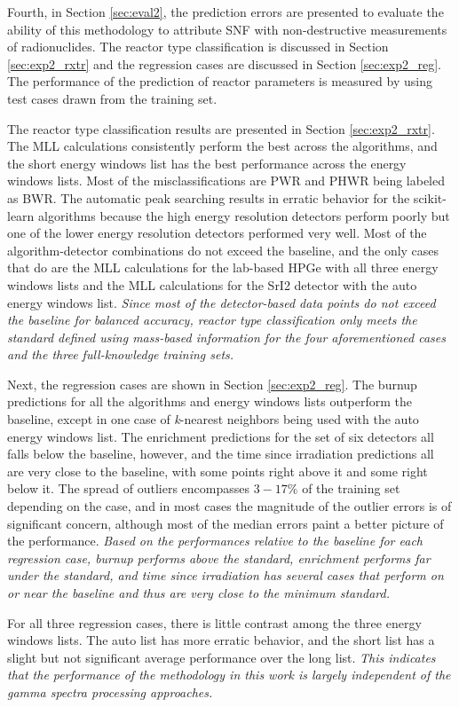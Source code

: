 Fourth, in Section \ref{sec:eval2}, the prediction errors are presented to
evaluate the ability of this methodology to attribute \gls{SNF} with
non-destructive measurements of radionuclides. The reactor type classification
is discussed in Section \ref{sec:exp2_rxtr} and the regression cases are
discussed in Section \ref{sec:exp2_reg}.  The performance of the prediction of
reactor parameters is measured by using test cases drawn from the training set.

The reactor type classification results are presented in Section
\ref{sec:exp2_rxtr}.  The \gls{MLL} calculations consistently perform the best
across the algorithms, and the short energy windows list has the best
performance across the energy windows lists.  Most of the misclassifications
are \gls{PWR} and \gls{PHWR} being labeled as \gls{BWR}.  The automatic peak
searching results in erratic behavior for the scikit-learn algorithms because
the high energy resolution detectors perform poorly but one of the lower energy
resolution detectors performed very well. Most of the algorithm-detector
combinations do not exceed the baseline, and the only cases that do are the
\gls{MLL} calculations for the lab-based \gls{HPGe} with all three energy
windows lists and the \gls{MLL} calculations for the \gls{SrI2} detector with
the auto energy windows list. \textit{Since most of the detector-based data
points do not exceed the baseline for balanced accuracy, reactor type
classification only meets the standard defined using mass-based information for
the four aforementioned cases and the three full-knowledge training sets.}

Next, the regression cases are shown in Section \ref{sec:exp2_reg}.  The burnup
predictions for all the algorithms and energy windows lists outperform the
baseline, except in one case of \textit{k}-nearest neighbors being used with
the auto energy windows list.  The enrichment predictions for the set of six
detectors all falls below the baseline, however, and the time since irradiation
predictions all are very close to the baseline, with some points right above it
and some right below it.  The spread of outliers encompasses $3-17\%$ of the
training set depending on the case, and in most cases the magnitude of the
outlier errors is of significant concern, although most of the median errors
paint a better picture of the performance.  \textit{Based on the performances
relative to the baseline for each regression case, burnup performs above the
standard, enrichment performs far under the standard, and time since
irradiation has several cases that perform on or near the baseline and thus are
very close to the minimum standard.}

For all three regression cases, there is little contrast among the three energy
windows lists. The auto list has more erratic behavior, and the short list has
a slight but not significant average performance over the long list.
\textit{This indicates that the performance of the methodology in this work is
largely independent of the gamma spectra processing approaches.}

